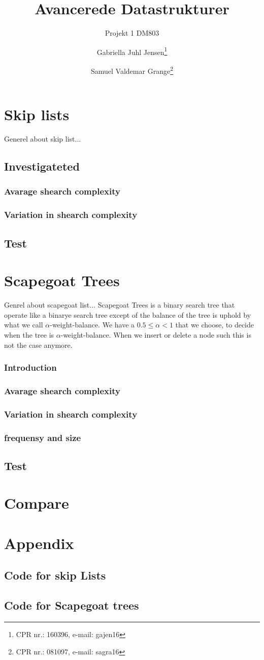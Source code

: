 \documentclass[oneside]{scrbook}
\title{Avancerede Datastrukturer}
\subtitle{Projekt 1 DM803}
\author{Gabriella Juhl Jensen\thanks{CPR nr.: 160396, e-mail: gajen16} \and Samuel Valdemar Grange\thanks{CPR nr.: 081097, e-mail: sagra16} }
\begin{document}
\maketitle
\chapter{Skip lists}
Generel about skip list...
\section{Investigateted}
\subsection{Avarage shearch complexity}
\subsection{Variation in shearch complexity}
\section{Test}
\chapter{Scapegoat Trees}
Genrel about scapegoat list...
Scapegoat Trees is a binary search tree that operate like a binarye search tree except of the balance of the tree is uphold by what we call $\alpha$-weight-balance. We have a $0.5\leq \alpha<1$ that we choose, to decide when the tree is $\alpha$-weight-balance. When we insert or delete a node such this is not the case anymore. 

\subsection{Introduction}
\subsection{Avarage shearch complexity}
\subsection{Variation in shearch complexity}
\subsection{frequensy and size}
\section{Test}
\chapter{Compare}
\chapter{Appendix}
\section{Code for skip Lists}
\section{Code for Scapegoat trees}
\end{document}
